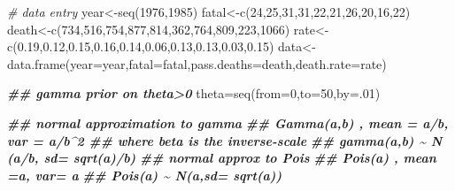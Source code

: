 \documentclass[
]{book}
\newenvironment{Shaded}{\begin{snugshade}}{\end{snugshade}}
\newcommand{\AttributeTok}[1]{\textcolor[rgb]{0.77,0.63,0.00}{#1}}
\newcommand{\CommentTok}[1]{\textcolor[rgb]{0.56,0.35,0.01}{\textit{#1}}}
\newcommand{\DecValTok}[1]{\textcolor[rgb]{0.00,0.00,0.81}{#1}}
\newcommand{\DocumentationTok}[1]{\textcolor[rgb]{0.56,0.35,0.01}{\textbf{\textit{#1}}}}
\newcommand{\FloatTok}[1]{\textcolor[rgb]{0.00,0.00,0.81}{#1}}
\newcommand{\FunctionTok}[1]{\textcolor[rgb]{0.00,0.00,0.00}{#1}}
\newcommand{\NormalTok}[1]{#1}
\newcommand{\OtherTok}[1]{\textcolor[rgb]{0.56,0.35,0.01}{#1}}
\theoremstyle{definition}
\theoremstyle{definition}
\theoremstyle{definition}
\theoremstyle{definition}
\theoremstyle{remark}
\begin{document}
\begin{Shaded}
\begin{Highlighting}[]
\CommentTok{\# data entry}
\NormalTok{ year}\OtherTok{\textless{}{-}}\FunctionTok{seq}\NormalTok{(}\DecValTok{1976}\NormalTok{,}\DecValTok{1985}\NormalTok{)}
\NormalTok{ fatal}\OtherTok{\textless{}{-}}\FunctionTok{c}\NormalTok{(}\DecValTok{24}\NormalTok{,}\DecValTok{25}\NormalTok{,}\DecValTok{31}\NormalTok{,}\DecValTok{31}\NormalTok{,}\DecValTok{22}\NormalTok{,}\DecValTok{21}\NormalTok{,}\DecValTok{26}\NormalTok{,}\DecValTok{20}\NormalTok{,}\DecValTok{16}\NormalTok{,}\DecValTok{22}\NormalTok{)}
\NormalTok{ death}\OtherTok{\textless{}{-}}\FunctionTok{c}\NormalTok{(}\DecValTok{734}\NormalTok{,}\DecValTok{516}\NormalTok{,}\DecValTok{754}\NormalTok{,}\DecValTok{877}\NormalTok{,}\DecValTok{814}\NormalTok{,}\DecValTok{362}\NormalTok{,}\DecValTok{764}\NormalTok{,}\DecValTok{809}\NormalTok{,}\DecValTok{223}\NormalTok{,}\DecValTok{1066}\NormalTok{)}
\NormalTok{ rate}\OtherTok{\textless{}{-}}\FunctionTok{c}\NormalTok{(}\FloatTok{0.19}\NormalTok{,}\FloatTok{0.12}\NormalTok{,}\FloatTok{0.15}\NormalTok{,}\FloatTok{0.16}\NormalTok{,}\FloatTok{0.14}\NormalTok{,}\FloatTok{0.06}\NormalTok{,}\FloatTok{0.13}\NormalTok{,}\FloatTok{0.13}\NormalTok{,}\FloatTok{0.03}\NormalTok{,}\FloatTok{0.15}\NormalTok{)}
\NormalTok{ data}\OtherTok{\textless{}{-}}\FunctionTok{data.frame}\NormalTok{(}\AttributeTok{year=}\NormalTok{year,}\AttributeTok{fatal=}\NormalTok{fatal,}\AttributeTok{pass.deaths=}\NormalTok{death,}\AttributeTok{death.rate=}\NormalTok{rate)}
 
 \DocumentationTok{\#\# gamma prior on theta\textgreater{}0}
\NormalTok{ theta}\OtherTok{=}\FunctionTok{seq}\NormalTok{(}\AttributeTok{from=}\DecValTok{0}\NormalTok{,}\AttributeTok{to=}\DecValTok{50}\NormalTok{,}\AttributeTok{by=}\NormalTok{.}\DecValTok{01}\NormalTok{)}

 \DocumentationTok{\#\# normal approximation to gamma}
  \DocumentationTok{\#\# Gamma(a,b) ,  mean = a/b,  var = a/b\^{}2  \#\# where beta is the inverse{-}scale}
   \DocumentationTok{\#\# gamma(a,b) \textasciitilde{}  N (a/b, sd= sqrt(a)/b)}
 \DocumentationTok{\#\# normal approx to Pois}
   \DocumentationTok{\#\# Pois(a) ,  mean =a, var= a}
    \DocumentationTok{\#\# Pois(a) \textasciitilde{} N(a,sd= sqrt(a))}
 

\end{Highlighting}
\end{Shaded}
\end{document}
